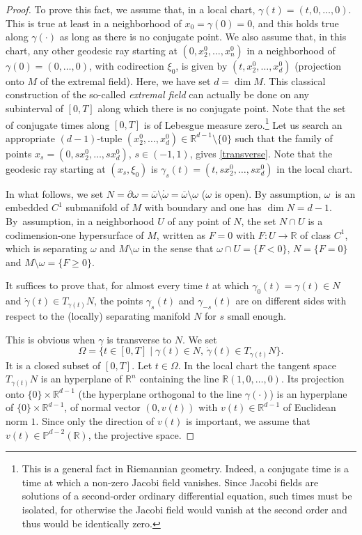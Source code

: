 \documentclass[10pt]{amsart}
\def\R{\mathbb{R}}
\theoremstyle{definition}
\begin{document}
\begin{proof}
To prove this fact, we assume that, in a local chart, $\gamma(t) = (t,0,\ldots,0)$. This is true at least in a neighborhood of $x_0=\gamma(0)=0$, and this holds true along $\gamma(\cdot)$ as long as there is no conjugate point. We also assume that, in this chart, any other geodesic ray starting at $(0,x_2^0,\ldots,x_n^0)$ in a neighborhood of $\gamma(0)=(0,\ldots,0)$, with codirection $\xi_0$, is given by $(t,x_2^0,\ldots,x_d^0)$ (projection onto $M$ of the extremal field). Here, we have set $d=\dim M$.
This classical construction of the so-called \emph{extremal field} can actually be done on any subinterval of $[0,T]$ along which there is no conjugate point.
Note that the set of conjugate times along $[0,T]$ is of Lebesgue measure zero.\footnote{This is a general fact in Riemannian geometry. Indeed, a conjugate time is a time at which a non-zero Jacobi field vanishes. Since Jacobi fields are solutions of a second-order ordinary differential equation, such times must be isolated, for otherwise the Jacobi field would vanish at the second order and thus would be identically zero.}
Let us search an appropriate $(d-1)$-tuple $(x_2^0,\ldots,x_d^0)\in\R^{d-1}\setminus\{0\}$ such that the family of points $x_s=(0,sx_2^0,\ldots,sx_d^0)$, $s\in(-1,1)$, gives \eqref{transverse}. Note that the geodesic ray starting at {$(x_s,\xi_0)$} is $\gamma_s(t) = (t,sx_2^0,\ldots,sx_d^0)$ in the local chart.

In what follows, we set $N=\partial\omega= \overline\omega \setminus \mathring{\omega} = \overline\omega \setminus \omega$ ($\omega$ is open).
By assumption, $\omega$~is an embedded $C^1$ submanifold of $M$ with boundary and one has $\dim N=d-1$. By~assumption, in a neighborhood $U$ of any point of $N$, the set $N\cap U$ is a codimension-one hypersurface of $M$, written as $F=0$ with $F:U\rightarrow\R$ of class $C^1$, which is separating $\omega$ and $M\setminus\omega$ in the sense that $\omega\cap U=\{F<0\}$, $N=\{F=0\}$ and $M\setminus\omega=\{F\geq 0\}$.

It suffices to prove that, for almost every time $t$ at which $\gamma_0(t)=\gamma(t)\in N$ and $\dot\gamma(t)\in T_{\gamma(t)}N$, the points $\gamma_s(t)$ and $\gamma_{-s}(t)$ are on different sides with respect to the (locally) separating manifold $N$ for $s$ small enough.

This is obvious when $\gamma$ is transverse to $N$.
We set
\[
\Omega=\{t\in[0,T] \mid \gamma(t)\in N,\, \dot\gamma(t)\in T_{\gamma(t)}N \}.
\]
It is a closed subset of $[0,T]$.
Let $t\in\Omega$. In the local chart the tangent space $T_{\gamma(t)}N$ is an hyperplane of $\R^n$ containing the line $\R(1,0,\ldots,0)$. Its projection onto $\{0\}\times\R^{d-1}$ (the hyperplane orthogonal to the line $\gamma(\cdot)$) is an hyperplane of $\{0\}\times\R^{d-1}$, of normal vector $(0,v(t))$ with $v(t)\in\R^{d-1}$ of Euclidean norm $1$. Since only the direction of $v(t)$ is important, we assume that $v(t)\in \mathbb{P}^{d-2}(\R)$, the projective space.


\end{proof}
\end{document}
